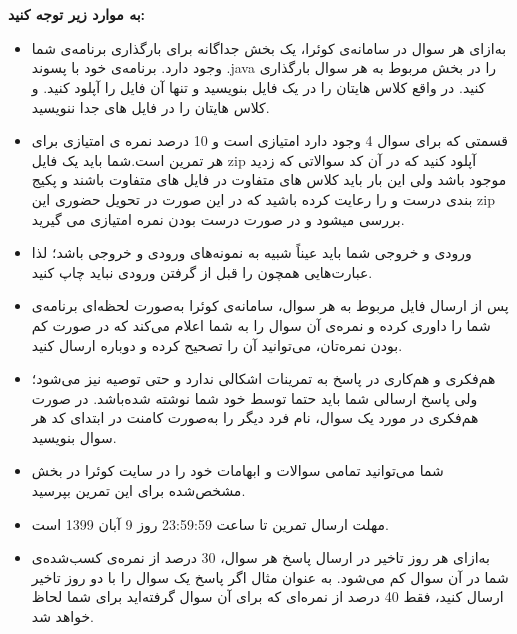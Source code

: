 \documentclass[]{article}
\begin{document}
\newpage
\pagestyle{fancy}
\fancyhf{}
\fancyfoot{}
\cfoot{\thepage}

\KashidaOff


 \Large \textbf{\\\\
به موارد زیر توجه کنید:}

\begin{itemize}[label=$\ast$]
\item
به‌ازای هر سوال در سامانه‌ی کوئرا، یک بخش جداگانه برای بارگذاری برنامه‌ی شما وجود دارد. برنامه‌ی خود با پسوند .java را در بخش مربوط به هر سوال بارگذاری کنید. در واقع کلاس هایتان را در یک فایل بنویسید و تنها آن فایل را آپلود کنید. و کلاس هایتان را در فایل های جدا ننویسید.
\item
قسمتی که برای سوال 4 وجود دارد امتیازی است و 10 درصد نمره ی امتیازی برای هر تمرین است.شما باید یک فایل zip آپلود کنید که در آن کد سوالاتی که زدید موجود باشد ولی این بار باید کلاس های متفاوت در فایل های متفاوت باشند و پکیج بندی درست و  را رعایت کرده باشید که در این صورت در تحویل حضوری این zip بررسی میشود و در صورت درست بودن نمره امتیازی می گیرید.

\item ورودی و خروجی شما باید عیناً شبیه به نمونه‌های ورودی و خروجی باشد؛ لذا عبارت‌هایی همچون  را قبل از گرفتن ورودی نباید چاپ کنید.
\item پس از ارسال فایل مربوط به هر سوال، سامانه‌ی کوئرا به‌صورت لحظه‌ای برنامه‌ی شما را داوری کرده و نمره‌ی آن سوال را به شما اعلام می‌کند که در صورت کم بودن نمره‌تان، می‌توانید آن را تصحیح کرده و دوباره ارسال کنید.
\item هم‌فکری و هم‌کاری در پاسخ به تمرینات اشکالی ندارد و حتی توصیه نیز می‌شود؛ ولی پاسخ ارسالی شما باید حتما توسط خود شما نوشته شده‌باشد. در صورت هم‌فکری در مورد یک سوال، نام فرد دیگر را به‌صورت کامنت در ابتدای کد هر سوال بنویسید.
\item شما می‌توانید تمامی سوالات و ابهامات خود را در سایت کوئرا در بخش مشخص‌شده برای این تمرین بپرسید.
\item مهلت ارسال تمرین تا ساعت 23:59:59 روز 9 آبان 1399 است.
\item به‌ازای هر روز تاخیر در ارسال پاسخ هر سوال، 30 درصد از نمره‌ی کسب‌شده‌ی شما در آن سوال کم می‌شود. به عنوان مثال اگر پاسخ یک سوال را با دو روز تاخیر ارسال کنید، فقط 40 درصد از نمره‌ای که برای آن سوال گرفته‌اید برای شما لحاظ خواهد شد.


\end{itemize}
\end{document}
